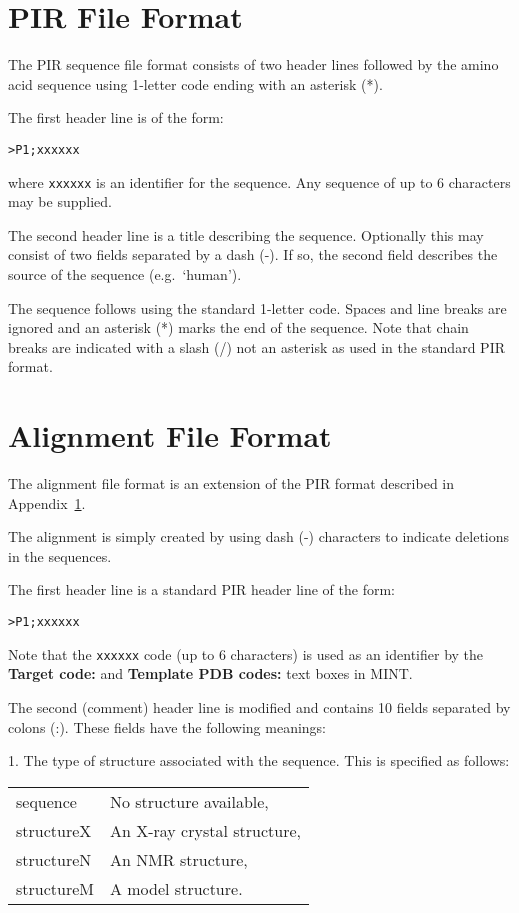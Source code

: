 \documentclass[12pt]{article}
\begin{document}
\section{PIR File Format}
\label{app:pir}
The PIR sequence file format consists of two header lines followed by
the amino acid sequence using 1-letter code ending with an asterisk
(*).

The first header line is of the form:
\begin{verbatim}
>P1;xxxxxx
\end{verbatim}
where {\tt xxxxxx} is an identifier for the sequence. Any sequence of up to
6 characters may be supplied.

The second header line is a title describing the sequence. Optionally
this may consist of two fields separated by a dash (-). If so, the
second field describes the source of the sequence (e.g.\ `human').

The sequence follows using the standard 1-letter code. Spaces and line
breaks are ignored and an asterisk (*) marks the end of the
sequence. Note that chain breaks are indicated with a slash (/) not an
asterisk as used in the standard PIR format.









\section{Alignment File Format}
\label{app:align}
The alignment file format is an extension of the PIR format described
in Appendix~\ref{app:pir}.

The alignment is simply created by using dash (-) characters to
indicate deletions in the sequences. 

The first header line is a standard PIR header line of the form:
\begin{verbatim}
>P1;xxxxxx
\end{verbatim}
Note that the {\tt xxxxxx} code (up to 6 characters) is used as an
identifier by the {\bfseries Target code:} and {\bfseries Template PDB
codes:} text boxes in MINT.

The second (comment) header line is modified and contains 10 fields
separated by colons (:). These fields have the following meanings:

1. The type of structure associated with the sequence. This is
specified as follows:
\begin{center}
\begin{tabular}{ll}
   sequence    & No structure available,        \\
   structureX  & An X-ray crystal structure,    \\
   structureN  & An NMR structure,              \\
   structureM  & A model structure.             \\
\end{tabular}
\end{center}
\end{document}
